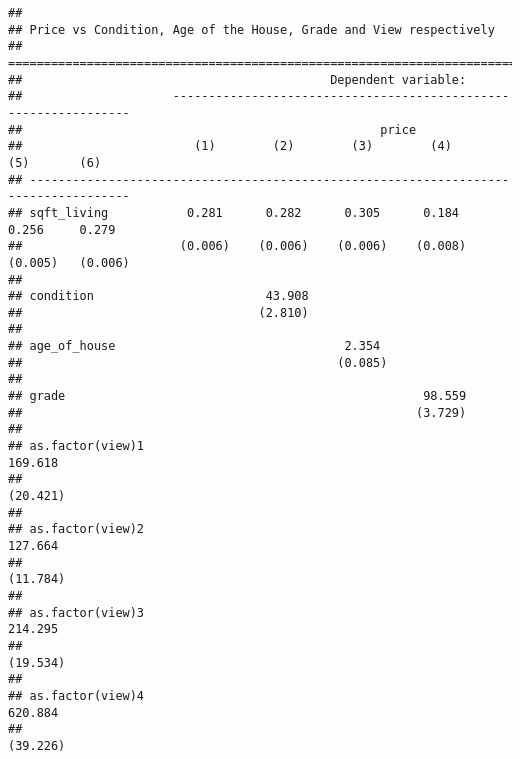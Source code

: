 \documentclass[
]{article}
\begin{document}
\begin{verbatim}
## 
## Price vs Condition, Age of the House, Grade and View respectively
## ====================================================================================
##                                           Dependent variable:                       
##                     ----------------------------------------------------------------
##                                                  price                              
##                        (1)        (2)        (3)        (4)        (5)       (6)    
## ------------------------------------------------------------------------------------
## sqft_living           0.281      0.282      0.305      0.184      0.256     0.279   
##                      (0.006)    (0.006)    (0.006)    (0.008)    (0.005)   (0.006)  
##                                                                                     
## condition                        43.908                                             
##                                 (2.810)                                             
##                                                                                     
## age_of_house                                2.354                                   
##                                            (0.085)                                  
##                                                                                     
## grade                                                  98.559                       
##                                                       (3.729)                       
##                                                                                     
## as.factor(view)1                                                 169.618            
##                                                                 (20.421)            
##                                                                                     
## as.factor(view)2                                                 127.664            
##                                                                 (11.784)            
##                                                                                     
## as.factor(view)3                                                 214.295            
##                                                                 (19.534)            
##                                                                                     
## as.factor(view)4                                                 620.884            
##                                                                 (39.226)            

\end{verbatim}
\end{document}
